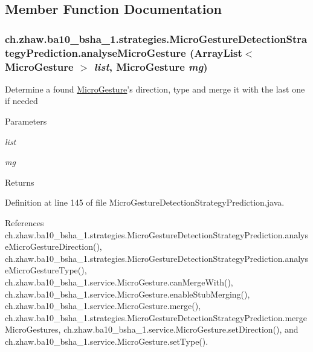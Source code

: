 \subsection{Member Function Documentation}
\hypertarget{classch_1_1zhaw_1_1ba10__bsha__1_1_1strategies_1_1MicroGestureDetectionStrategyPrediction_a741f6f5dfadc6a6ad25f03088ff55fc9}{
\subsubsection[{analyseMicroGesture}]{ ch.zhaw.ba10\_\-bsha\_\-1.strategies.MicroGestureDetectionStrategyPrediction.analyseMicroGesture (ArrayList$<$ {\bf MicroGesture} $>$ {\em list}, \/  {\bf MicroGesture} {\em mg})}}
\label{classch_1_1zhaw_1_1ba10__bsha__1_1_1strategies_1_1MicroGestureDetectionStrategyPrediction_a741f6f5dfadc6a6ad25f03088ff55fc9}
Determine a found \hyperlink{}{MicroGesture}'s direction, type and merge it with the last one if needed


\begin{DoxyParams}{Parameters}
\item[{\em list}]\item[{\em mg}]\end{DoxyParams}
\begin{DoxyReturn}{Returns}

\end{DoxyReturn}


Definition at line 145 of file MicroGestureDetectionStrategyPrediction.java.

References ch.zhaw.ba10\_\-bsha\_\-1.strategies.MicroGestureDetectionStrategyPrediction.analyseMicroGestureDirection(), ch.zhaw.ba10\_\-bsha\_\-1.strategies.MicroGestureDetectionStrategyPrediction.analyseMicroGestureType(), ch.zhaw.ba10\_\-bsha\_\-1.service.MicroGesture.canMergeWith(), ch.zhaw.ba10\_\-bsha\_\-1.service.MicroGesture.enableStubMerging(), ch.zhaw.ba10\_\-bsha\_\-1.service.MicroGesture.merge(), ch.zhaw.ba10\_\-bsha\_\-1.strategies.MicroGestureDetectionStrategyPrediction.mergeMicroGestures, ch.zhaw.ba10\_\-bsha\_\-1.service.MicroGesture.setDirection(), and ch.zhaw.ba10\_\-bsha\_\-1.service.MicroGesture.setType().

